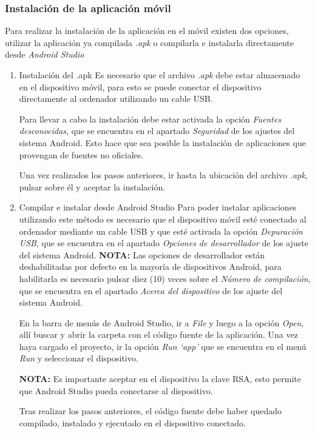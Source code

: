 \documentclass[12pt]{article}
\begin{document}
        \subsubsection{Instalación de la aplicación móvil}
            Para realizar la instalación de la aplicación en el móvil existen dos opciones, utilizar la aplicación ya compilada \textit{.apk} o compilarla e instalarla directamente desde \textit{Android Studio}
            
            \begin{enumerate}
                \item Instalación del .apk 
                Es necesario que el archivo \textit{.apk} debe estar almacenado en el dispositivo móvil, para esto se puede conectar el dispositivo directamente al ordenador utilizando un cable USB.

                Para llevar a cabo la instalación debe estar activada la opción \textit{Fuentes desconocidas}, que se encuentra en el apartado \textit{Seguridad} de los ajustes del sistema Android. Esto hace que sea posible la instalación de aplicaciones que provengan de fuentes no oficiales.

                Una vez realizados los pasos anteriores, ir hasta la ubicación del archivo \textit{.apk}, pulsar sobre él y aceptar la instalación.

                \item Compilar e instalar desde Android Studio
                Para poder instalar aplicaciones utilizando este método es necesario que el dispositivo móvil esté conectado al ordenador mediante un cable USB y que esté activada la opción \textit{Depuración USB}, que se encuentra en el apartado \textit{Opciones de desarrollador} de los ajuste del sistema Android.
                \textbf{NOTA:} Las opciones de desarrollador están deshabilitadas por defecto en la mayoría de dispositivos Android, para habilitarla es necesario pulsar diez (10) veces sobre el \textit{Número de compilación}, que se encuentra en el apartado \textit{Acerca del dispositivo} de los ajuste del sistema Android.

                En la barra de menús de Android Studio, ir a \textit{File} y luego a la opción \textit{Open}, allí buscar y abrir la carpeta con el código fuente de la aplicación. Una vez haya cargado el proyecto, ir la opción \textit{Run `app'} que se encuentra en el menú \textit{Run} y seleccionar el dispositivo.
                
                \textbf{NOTA:} Es importante aceptar en el dispositivo la clave RSA, esto permite que Android Studio pueda conectarse al dispositivo.

                Tras realizar los pasos anteriores, el código fuente debe haber quedado compilado, instalado y ejecutado en el dispositivo conectado.
            \end{enumerate}
\end{document}
